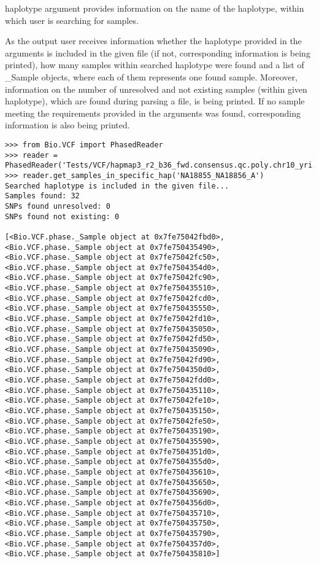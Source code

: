 \noindent haplotype argument provides information on the name of the haplotype, within which user is searching for samples.

\noindent As the output user receives information whether the haplotype provided in the arguments is included in the given file (if not, corresponding information 
is being printed), how many samples within searched haplotype were found and a list of \_Sample objects, where each of them represents one found sample. Moreover,
information on the number of unresolved and not existing samples (within given haplotype), which are found during parsing a file, is being printed. If no sample 
meeting the requirements provided in the arguments was found, corresponding information is also being printed.

\begin{verbatim}
>>> from Bio.VCF import PhasedReader
>>> reader = PhasedReader('Tests/VCF/hapmap3_r2_b36_fwd.consensus.qc.poly.chr10_yri.D.phased')
>>> reader.get_samples_in_specific_hap('NA18855_NA18856_A')
Searched haplotype is included in the given file...
Samples found: 32
SNPs found unresolved: 0
SNPs found not existing: 0

[<Bio.VCF.phase._Sample object at 0x7fe75042fbd0>, <Bio.VCF.phase._Sample object at 0x7fe750435490>, <Bio.VCF.phase._Sample object at 0x7fe75042fc50>, <Bio.VCF.phase._Sample object at 0x7fe7504354d0>, <Bio.VCF.phase._Sample object at 0x7fe75042fc90>, <Bio.VCF.phase._Sample object at 0x7fe750435510>, <Bio.VCF.phase._Sample object at 0x7fe75042fcd0>, <Bio.VCF.phase._Sample object at 0x7fe750435550>, <Bio.VCF.phase._Sample object at 0x7fe75042fd10>, <Bio.VCF.phase._Sample object at 0x7fe750435050>, <Bio.VCF.phase._Sample object at 0x7fe75042fd50>, <Bio.VCF.phase._Sample object at 0x7fe750435090>, <Bio.VCF.phase._Sample object at 0x7fe75042fd90>, <Bio.VCF.phase._Sample object at 0x7fe7504350d0>, <Bio.VCF.phase._Sample object at 0x7fe75042fdd0>, <Bio.VCF.phase._Sample object at 0x7fe750435110>, <Bio.VCF.phase._Sample object at 0x7fe75042fe10>, <Bio.VCF.phase._Sample object at 0x7fe750435150>, <Bio.VCF.phase._Sample object at 0x7fe75042fe50>, <Bio.VCF.phase._Sample object at 0x7fe750435190>, <Bio.VCF.phase._Sample object at 0x7fe750435590>, <Bio.VCF.phase._Sample object at 0x7fe7504351d0>, <Bio.VCF.phase._Sample object at 0x7fe7504355d0>, <Bio.VCF.phase._Sample object at 0x7fe750435610>, <Bio.VCF.phase._Sample object at 0x7fe750435650>, <Bio.VCF.phase._Sample object at 0x7fe750435690>, <Bio.VCF.phase._Sample object at 0x7fe7504356d0>, <Bio.VCF.phase._Sample object at 0x7fe750435710>, <Bio.VCF.phase._Sample object at 0x7fe750435750>, <Bio.VCF.phase._Sample object at 0x7fe750435790>, <Bio.VCF.phase._Sample object at 0x7fe7504357d0>, <Bio.VCF.phase._Sample object at 0x7fe750435810>]
\end{verbatim}

